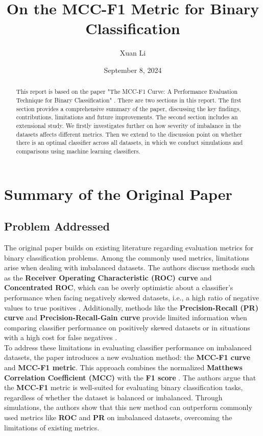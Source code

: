 \documentclass[12pt, oneside]{amsart}
\title{On the MCC-F1 Metric for Binary Classification}
\author{Xuan Li}
\date{September 8, 2024}
\theoremstyle{definition}
\theoremstyle{remark}
\numberwithin{equation}{section}
\begin{document}
\begin{abstract}
    This report is based on the paper "The MCC-F1 Curve: A Performance Evaluation Technique for Binary Classification" \citep{Cao2020}. There are two sections in this report. The first section provides a comprehensive summary of the paper, discussing the key findings, contributions, limitations and future improvements. The second section includes an extensional study. We firstly investigates further on how severity of imbalance in the datasets affects different metrics. Then we extend to the discussion point on whether there is an optimal classifier across all datasets, in which we conduct simulations and comparisons using machine learning classifiers. 
\end{abstract}
\maketitle
\tableofcontents


\section{Summary of the Original Paper}

\subsection{Problem Addressed}
The original paper \citep{Cao2020} builds on existing literature regarding evaluation metrics for binary classification problems. Among the commonly used metrics, limitations arise when dealing with imbalanced datasets. The authors discuss methods such as the \textbf{Receiver Operating Characteristic (ROC) curve} and \textbf{Concentrated ROC}, which can be overly optimistic about a classifier's performance when facing negatively skewed datasets, i.e., a high ratio of negative values to true positives \citep{fawcett2006} \citep{swamidass2010}. Additionally, methods like the \textbf{Precision-Recall (PR) curve}
 and \textbf{Precision-Recall-Gain curve} provide limited information when comparing classifier performance on positively skewed datasets or in situations with a high cost for false negatives \citep{swamidass2010} \citep{flach2015}. \\

To address these limitations in evaluating classifier performance on imbalanced datasets, the paper introduces a new evaluation method: the \textbf{MCC-F1 curve} and \textbf{MCC-F1 metric}. This approach combines the normalized \textbf{Matthews Correlation Coefficient (MCC)} with the \textbf{F1 score} \citep{Chicco2020}. The authors argue that the \textbf{MCC-F1} metric is well-suited for evaluating binary classification tasks, regardless of whether the dataset is balanced or imbalanced. Through simulations, the authors show that this new method can outperform commonly used metrics like \textbf{ROC} and \textbf{PR} on imbalanced datasets, overcoming the limitations of existing metrics.
\end{document}
